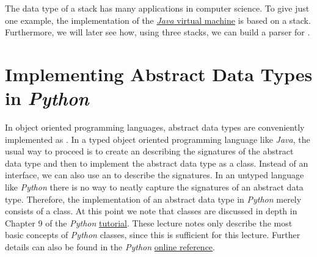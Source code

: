 The data type of a stack has many applications in computer science.  To give just one example, the
implementation of the \href{https://en.wikipedia.org/wiki/Java_virtual_machine}{\textsl{Java} virtual machine}
is based on a stack.  Furthermore,  we will later see how,  using three stacks, we can build a parser for
. 


\section[Implementation]{Implementing Abstract Data Types in \textsl{Python}}
In object oriented programming languages, abstract data types are conveniently implemented as
.  In a typed object oriented programming language like \textsl{Java}, the usual way to proceed
is to create an  describing the signatures of the abstract data type and then to implement
the abstract data type as a class.  Instead of an interface, we can also use an 
to describe the signatures.  In an untyped language like \textsl{Python} there is no way to
neatly capture the signatures of an abstract data type.  Therefore, the implementation of an abstract data type in
\textsl{Python} merely consists of a class.  At this point we note that classes are discussed in depth in
Chapter 9 of the \textsl{Python}  \href{https://docs.python.org/3.6/tutorial/classes.html}{tutorial}.  These
lecture notes only describe the most basic concepts of \textsl{Python} classes, since this is sufficient for this
lecture.  Further details can also be found in the \textsl{Python}
\href{https://docs.python.org/3.6/reference/index.html}{online reference}. 


